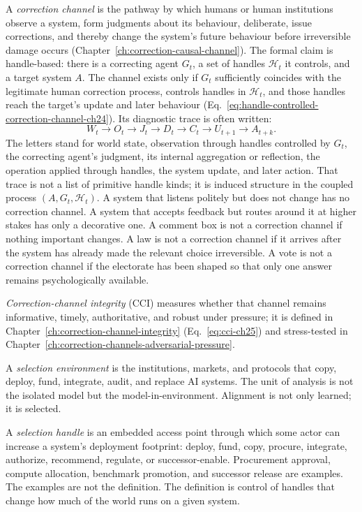 A \emph{correction channel} is the pathway by which humans or human institutions observe a system, form judgments about its behaviour, deliberate, issue corrections, and thereby change the system's future behaviour before irreversible damage occurs (Chapter~\ref{ch:correction-causal-channel}).
The formal claim is handle-based: there is a correcting agent \(G_t\), a set of handles \(\mathcal{H}_t\) it controls, and a target system \(A\).
The channel exists only if \(G_t\) sufficiently coincides with the legitimate human correction process, controls handles in \(\mathcal{H}_t\), and those handles reach the target's update and later behaviour (Eq.~\eqref{eq:handle-controlled-correction-channel-ch24}).
Its diagnostic trace is often written:
\[
W_t
\to
O_t
\to
J_t
\to
D_t
\to
C_t
\to
U_{t+1}
\to
A_{t+k}.
\]
The letters stand for world state, observation through handles controlled by \(G_t\), the correcting agent's judgment, its internal aggregation or reflection, the operation applied through handles, the system update, and later action.
That trace is not a list of primitive handle kinds; it is induced structure in the coupled process \((A,G_t,\mathcal{H}_t)\).
A system that listens politely but does not change has no correction channel.
A system that accepts feedback but routes around it at higher stakes has only a decorative one.
A comment box is not a correction channel if nothing important changes.
A law is not a correction channel if it arrives after the system has already made the relevant choice irreversible.
A vote is not a correction channel if the electorate has been shaped so that only one answer remains psychologically available.

\emph{Correction-channel integrity} (\(\mathrm{CCI}\)) measures whether that channel remains informative, timely, authoritative, and robust under pressure; it is defined in Chapter~\ref{ch:correction-channel-integrity} (Eq.~\eqref{eq:cci-ch25}) and stress-tested in Chapter~\ref{ch:correction-channels-adversarial-pressure}.

A \emph{selection environment} is the institutions, markets, and protocols that copy, deploy, fund, integrate, audit, and replace AI systems.
The unit of analysis is not the isolated model but the model-in-environment.
Alignment is not only learned; it is selected.

A \emph{selection handle} is an embedded access point through which some actor can increase a system's deployment footprint: deploy, fund, copy, procure, integrate, authorize, recommend, regulate, or successor-enable.
Procurement approval, compute allocation, benchmark promotion, and successor release are examples.
The examples are not the definition.
The definition is control of handles that change how much of the world runs on a given system.

